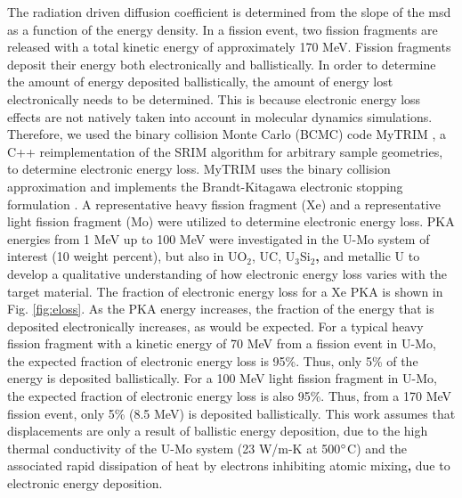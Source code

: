\documentclass[review]{elsarticle}
\providecommand{\DIFaddtex}[1]{{\bf #1}} %
\providecommand{\DIFdeltex}[1]{} %
\providecommand{\DIFaddbegin}{\protect\color{blue}} %
\providecommand{\DIFaddend}{\protect\color{black}} %
\providecommand{\DIFdelbegin}{\protect\color{red}} %
\providecommand{\DIFdelend}{\protect\color{black}} %
\providecommand{\DIFadd}[1]{\texorpdfstring{\DIFaddtex{#1}}{#1}} %
\providecommand{\DIFdel}[1]{\texorpdfstring{\DIFdeltex{#1}}{}} %
\newcommand{\DIFscaledelfig}{0.5}
\newlength{\DIFdelgraphicswidth} %
\newlength{\DIFdelgraphicsheight} %
\newcommand{\DIFaddincludegraphics}[2][]{{\color{blue}\fbox{\DIFOincludegraphics[#1]{#2}}}} %
\newcommand{\DIFdelincludegraphics}[2][]{%
\sbox{\DIFdelgraphicsbox}{\DIFOincludegraphics[#1]{#2}}%
\settoboxwidth{\DIFdelgraphicswidth}{\DIFdelgraphicsbox} %
\settoboxtotalheight{\DIFdelgraphicsheight}{\DIFdelgraphicsbox} %
\scalebox{\DIFscaledelfig}{%
\parbox[b]{\DIFdelgraphicswidth}{\usebox{\DIFdelgraphicsbox}\\[-\baselineskip] \rule{\DIFdelgraphicswidth}{0em}}\llap{\resizebox{\DIFdelgraphicswidth}{\DIFdelgraphicsheight}{%
\setlength{\unitlength}{\DIFdelgraphicswidth}%
\begin{picture}(1,1)%
\thicklines\linethickness{2pt} %
{\color[rgb]{1,0,0}\put(0,0){\framebox(1,1){}}}%
{\color[rgb]{1,0,0}\put(0,0){\line( 1,1){1}}}%
{\color[rgb]{1,0,0}\put(0,1){\line(1,-1){1}}}%
\end{picture}%
}\hspace*{3pt}}} %
} %
\DeclareRobustCommand{\DIFaddbegin}{\DIFOaddbegin \let\includegraphics\DIFaddincludegraphics} %
\DeclareRobustCommand{\DIFaddend}{\DIFOaddend \let\includegraphics\DIFOincludegraphics} %
\DeclareRobustCommand{\DIFdelbegin}{\DIFOdelbegin \let\includegraphics\DIFdelincludegraphics} %
\DeclareRobustCommand{\DIFdelend}{\DIFOaddend \let\includegraphics\DIFOincludegraphics} %
\begin{document}
The radiation driven diffusion coefficient is determined from the slope of the msd as a function of the energy density. In a fission event, two fission fragments are released with a total kinetic energy of approximately 170 MeV. Fission fragments deposit their energy both electronically and ballistically. In order to determine the amount of energy deposited ballistically, the amount of energy lost electronically needs to be determined. This is because electronic energy loss effects are not natively taken into account in molecular dynamics simulations. Therefore, we used the binary collision Monte Carlo (BCMC) code MyTRIM \cite{myTRIM}, a C++ reimplementation of the SRIM algorithm for arbitrary sample geometries, to determine electronic energy loss. MyTRIM uses the binary collision approximation and implements the Brandt-Kitagawa electronic stopping formulation \cite{brandt1982}. A representative heavy fission fragment (Xe) and a representative light fission fragment (Mo) were utilized to determine electronic energy loss. PKA energies from 1 MeV up to 100 MeV were investigated in the U-Mo system of interest (10 weight percent), but also in UO$_2$, UC, U$_3$Si$_2$\DIFaddbegin \DIFadd{, }\DIFaddend and metallic U \DIFdelbegin \DIFdel{, }\DIFdelend to develop a qualitative understanding of how electronic energy loss varies with the target material. The fraction of electronic energy loss for a Xe PKA is shown in Fig. \ref{fig:eloss}. As the PKA energy increases, the fraction of the energy that is deposited electronically increases, as would be expected. For a typical heavy fission fragment with a kinetic energy of 70 MeV from a fission event in U-Mo, the expected fraction of electronic energy loss is 95\%. Thus, only 5\% of the energy is deposited ballistically. For a 100 MeV light fission fragment in U-Mo, the expected fraction of electronic energy loss is also 95\%. Thus, from a 170 MeV fission event, only 5\% (8.5 MeV) is deposited ballistically. This work assumes that displacements are only a result of ballistic energy deposition, due to the high thermal conductivity of the U-Mo system (23 W/m-K at 500$\degree$C) \cite{umo_handbook} and the associated rapid dissipation of heat by electrons inhibiting atomic mixing\DIFaddbegin \DIFadd{, }\DIFaddend due to electronic energy deposition. 
\end{document}
